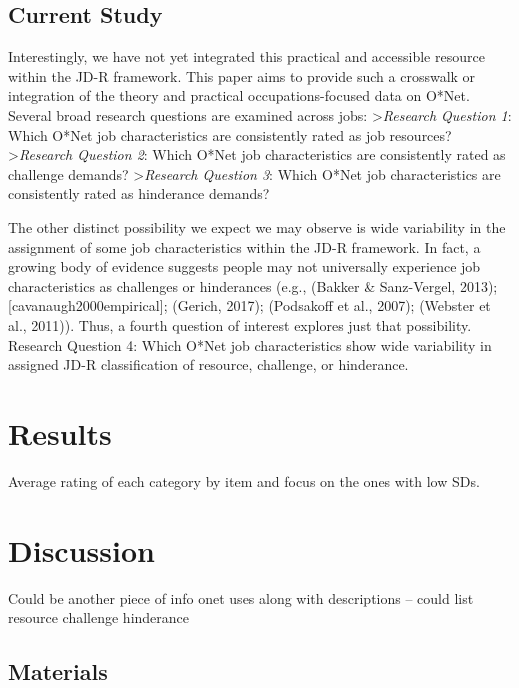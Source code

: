 \documentclass[
  english,
  man]{apa6}
\begin{document}
\hypertarget{current-study}{%
\subsection{Current Study}\label{current-study}}

Interestingly, we have not yet integrated this practical and accessible resource within the JD-R framework. This paper aims to provide such a crosswalk or integration of the theory and practical occupations-focused data on O*Net. Several broad research questions are examined across jobs:
\textgreater{}\emph{Research Question 1}: Which O*Net job characteristics are consistently rated as job resources?
\textgreater{}\emph{Research Question 2}: Which O*Net job characteristics are consistently rated as challenge demands?
\textgreater{}\emph{Research Question 3}: Which O*Net job characteristics are consistently rated as hinderance demands?

The other distinct possibility we expect we may observe is wide variability in the assignment of some job characteristics within the JD-R framework. In fact, a growing body of evidence suggests people may not universally experience job characteristics as challenges or hinderances (e.g., (Bakker \& Sanz-Vergel, 2013); {[}cavanaugh2000empirical{]}; (Gerich, 2017); (Podsakoff et al., 2007); (Webster et al., 2011)). Thus, a fourth question of interest explores just that possibility.
Research Question 4: Which O*Net job characteristics show wide variability in assigned JD-R classification of resource, challenge, or hinderance.

\hypertarget{results}{%
\section{Results}\label{results}}

Average rating of each category by item and focus on the ones with low SDs.

\hypertarget{discussion}{%
\section{Discussion}\label{discussion}}

Could be another piece of info onet uses along with descriptions -- could list resource challenge hinderance

\hypertarget{materials}{%
\subsection{Materials}\label{materials}}
\end{document}
